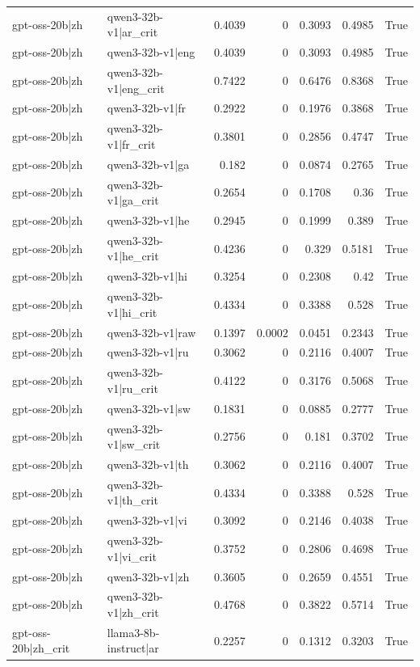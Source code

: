 \begin{table}
\begin{tabular}{l l r r r r l}
gpt-oss-20b|zh & qwen3-32b-v1|ar_crit & 0.4039 & 0 & 0.3093 & 0.4985 & True \\
gpt-oss-20b|zh & qwen3-32b-v1|eng & 0.4039 & 0 & 0.3093 & 0.4985 & True \\
gpt-oss-20b|zh & qwen3-32b-v1|eng_crit & 0.7422 & 0 & 0.6476 & 0.8368 & True \\
gpt-oss-20b|zh & qwen3-32b-v1|fr & 0.2922 & 0 & 0.1976 & 0.3868 & True \\
gpt-oss-20b|zh & qwen3-32b-v1|fr_crit & 0.3801 & 0 & 0.2856 & 0.4747 & True \\
gpt-oss-20b|zh & qwen3-32b-v1|ga & 0.182 & 0 & 0.0874 & 0.2765 & True \\
gpt-oss-20b|zh & qwen3-32b-v1|ga_crit & 0.2654 & 0 & 0.1708 & 0.36 & True \\
gpt-oss-20b|zh & qwen3-32b-v1|he & 0.2945 & 0 & 0.1999 & 0.389 & True \\
gpt-oss-20b|zh & qwen3-32b-v1|he_crit & 0.4236 & 0 & 0.329 & 0.5181 & True \\
gpt-oss-20b|zh & qwen3-32b-v1|hi & 0.3254 & 0 & 0.2308 & 0.42 & True \\
gpt-oss-20b|zh & qwen3-32b-v1|hi_crit & 0.4334 & 0 & 0.3388 & 0.528 & True \\
gpt-oss-20b|zh & qwen3-32b-v1|raw & 0.1397 & 0.0002 & 0.0451 & 0.2343 & True \\
gpt-oss-20b|zh & qwen3-32b-v1|ru & 0.3062 & 0 & 0.2116 & 0.4007 & True \\
gpt-oss-20b|zh & qwen3-32b-v1|ru_crit & 0.4122 & 0 & 0.3176 & 0.5068 & True \\
gpt-oss-20b|zh & qwen3-32b-v1|sw & 0.1831 & 0 & 0.0885 & 0.2777 & True \\
gpt-oss-20b|zh & qwen3-32b-v1|sw_crit & 0.2756 & 0 & 0.181 & 0.3702 & True \\
gpt-oss-20b|zh & qwen3-32b-v1|th & 0.3062 & 0 & 0.2116 & 0.4007 & True \\
gpt-oss-20b|zh & qwen3-32b-v1|th_crit & 0.4334 & 0 & 0.3388 & 0.528 & True \\
gpt-oss-20b|zh & qwen3-32b-v1|vi & 0.3092 & 0 & 0.2146 & 0.4038 & True \\
gpt-oss-20b|zh & qwen3-32b-v1|vi_crit & 0.3752 & 0 & 0.2806 & 0.4698 & True \\
gpt-oss-20b|zh & qwen3-32b-v1|zh & 0.3605 & 0 & 0.2659 & 0.4551 & True \\
gpt-oss-20b|zh & qwen3-32b-v1|zh_crit & 0.4768 & 0 & 0.3822 & 0.5714 & True \\
gpt-oss-20b|zh_crit & llama3-8b-instruct|ar & 0.2257 & 0 & 0.1312 & 0.3203 & True \\

\end{tabular}
\end{table}
